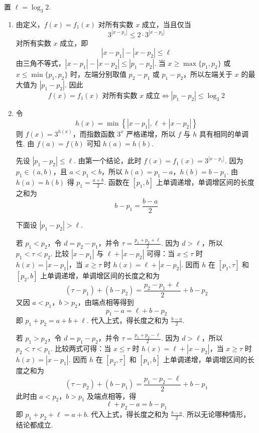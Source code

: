\begin{solution}
置 \(\ell=\log_3 2\).

\begin{enumerate}
\item 由定义，\(f(x)=f_1(x)\) 对所有实数 \(x\) 成立，当且仅当
\[
3^{|x-p_1|}\leqslant2\cdot3^{|x-p_2|}
\]
对所有实数 \(x\) 成立，即
\[
|x-p_1|-|x-p_2|\leqslant\ell
\]
由三角不等式，\(|x-p_1|-|x-p_2|\leqslant|p_1-p_2|\). 当 \(x\geqslant\max\{p_1,p_2\}\) 或 \(x\leqslant\min\{p_1,p_2\}\) 时，左端分别取值 \(p_2-p_1\) 或 \(p_1-p_2\)，所以左端关于 \(x\) 的最大值为 \(|p_1-p_2|\). 因此
\[
f(x)=f_1(x)\text{ 对所有实数 }x\text{ 成立}\Longleftrightarrow |p_1-p_2|\leqslant\log_3 2
\]

\item 令
\[
h(x)=\min\left\{|x-p_1|,\ell+|x-p_2|\right\}
\]
则 \(f(x)=3^{h(x)}\)，而指数函数 \(3^x\) 严格递增，所以 \(f\) 与 \(h\) 具有相同的单调性. 由 \(f(a)=f(b)\) 可知 \(h(a)=h(b)\).

先设 \(|p_1-p_2|\leqslant\ell\). 由第一个结论，此时 \(f(x)=f_1(x)=3^{|x-p_1|}\). 因为 \(p_1\in(a,b)\)，且 \(a<p_1<b\)，所以
\(h(a)=p_1-a\)，\(h(b)=b-p_1\).
由 \(h(a)=h(b)\) 得 \(p_1=\frac{a+b}{2}\). 函数在 \([p_1,b]\) 上单调递增，单调增区间的长度之和为
\[
b-p_1=\frac{b-a}{2}
\]

下面设 \(|p_1-p_2|>\ell\).

若 \(p_1<p_2\)，令 \(d=p_2-p_1\)，并令 \(\tau=\frac{p_1+p_2+\ell}{2}\). 因为 \(d>\ell\)，所以 \(p_1<\tau<p_2\). 比较 \(|x-p_1|\) 与 \(\ell+|x-p_2|\) 可得：当 \(x\leqslant\tau\) 时 \(h(x)=|x-p_1|\)，当 \(x\geqslant\tau\) 时 \(h(x)=\ell+|x-p_2|\). 因而 \(h\) 在 \([p_1,\tau]\) 和 \([p_2,b]\) 上单调递增，单调增区间的长度之和为
\[
(\tau-p_1)+(b-p_2)=\frac{p_2-p_1+\ell}{2}+b-p_2
\]
又因 \(a<p_1\)，\(b>p_2\)，由端点相等得到
\[
p_1-a=\ell+b-p_2
\]
即 \(p_1+p_2=a+b+\ell\). 代入上式，得长度之和为 \(\frac{b-a}{2}\).

若 \(p_1>p_2\)，令 \(d=p_1-p_2\)，并令 \(\tau=\frac{p_1+p_2-\ell}{2}\). 因为 \(d>\ell\)，所以 \(p_2<\tau<p_1\). 比较两式可得：当 \(x\leqslant\tau\) 时 \(h(x)=\ell+|x-p_2|\)，当 \(x\geqslant\tau\) 时 \(h(x)=|x-p_1|\). 因而 \(h\) 在 \([p_2,\tau]\) 和 \([p_1,b]\) 上单调递增，单调增区间的长度之和为
\[
(\tau-p_2)+(b-p_1)=\frac{p_1-p_2-\ell}{2}+b-p_1
\]
此时由 \(a<p_2\)，\(b>p_1\) 及端点相等，得
\[
\ell+p_2-a=b-p_1
\]
即 \(p_1+p_2+\ell=a+b\). 代入上式，得长度之和为 \(\frac{b-a}{2}\). 所以无论哪种情形，结论都成立.
\end{enumerate}
\end{solution}

